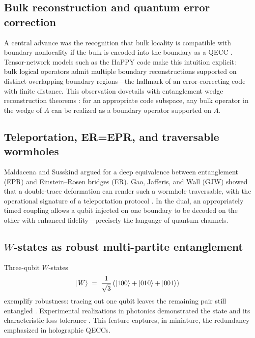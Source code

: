 \documentclass[11pt]{article}
\begin{document}
\subsection{Bulk reconstruction and quantum error correction}
A central advance was the recognition that bulk locality is compatible with boundary nonlocality if the bulk is encoded into the boundary as a QECC \cite{ADH2015}. Tensor-network models such as the HaPPY code \cite{Pastawski2015} make this intuition explicit: bulk logical operators admit multiple boundary reconstructions supported on distinct overlapping boundary regions---the hallmark of an error-correcting code with finite distance. This observation dovetails with entanglement wedge reconstruction theorems \cite{ADH2015}: for an appropriate code subspace, any bulk operator in the wedge of $A$ can be realized as a boundary operator supported on $A$.

\subsection{Teleportation, ER=EPR, and traversable wormholes}
Maldacena and Susskind \cite{ERisEPR} argued for a deep equivalence between entanglement (EPR) and Einstein--Rosen bridges (ER). Gao, Jafferis, and Wall (GJW) showed that a double-trace deformation can render such a wormhole traversable, with the operational signature of a teleportation protocol \cite{GJW2017}. In the dual, an appropriately timed coupling allows a qubit injected on one boundary to be decoded on the other with enhanced fidelity---precisely the language of quantum channels.

\subsection{$W$-states as robust multi-partite entanglement}
Three-qubit $W$-states
\begin{equation}
\ket{W} \;=\; \frac{1}{\sqrt{3}} \left( \ket{100} + \ket{010} + \ket{001} \right)
\end{equation}
exemplify robustness: tracing out one qubit leaves the remaining pair still entangled \cite{Dur2000}. Experimental realizations in photonics demonstrated the state and its characteristic loss tolerance \cite{Eibl2004}. This feature captures, in miniature, the redundancy emphasized in holographic QECCs.
\end{document}

